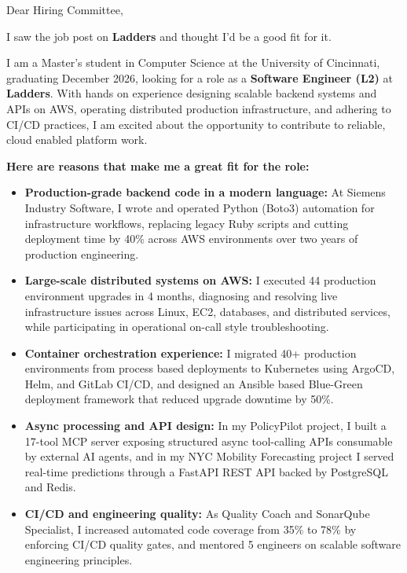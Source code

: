 \documentclass[11pt]{letter}
\date{}
\begin{document}
\begin{letter}{}

\opening{Dear Hiring Committee,}

I saw the job post on \textbf{Ladders} and thought I'd be a good fit for it.

I am a Master's student in Computer Science at the University of Cincinnati, graduating December 2026, looking for a role as a \textbf{Software Engineer (L2)} at \textbf{Ladders}. With hands on experience designing scalable backend systems and APIs on AWS, operating distributed production infrastructure, and adhering to CI/CD practices, I am excited about the opportunity to contribute to reliable, cloud enabled platform work.

\textbf{Here are reasons that make me a great fit for the role:}

\begin{itemize}[leftmargin=*, itemsep=0.45em]
    \item \textbf{Production-grade backend code in a modern language:} At Siemens Industry Software, I wrote and operated Python (Boto3) automation for infrastructure workflows, replacing legacy Ruby scripts and cutting deployment time by 40\% across AWS environments over two years of production engineering.

    \item \textbf{Large-scale distributed systems on AWS:} I executed 44 production environment upgrades in 4 months, diagnosing and resolving live infrastructure issues across Linux, EC2, databases, and distributed services, while participating in operational on-call style troubleshooting.

    \item \textbf{Container orchestration experience:} I migrated 40+ production environments from process based deployments to Kubernetes using ArgoCD, Helm, and GitLab CI/CD, and designed an Ansible based Blue-Green deployment framework that reduced upgrade downtime by 50\%.

    \item \textbf{Async processing and API design:} In my PolicyPilot project, I built a 17-tool MCP server exposing structured async tool-calling APIs consumable by external AI agents, and in my NYC Mobility Forecasting project I served real-time predictions through a FastAPI REST API backed by PostgreSQL and Redis.

    \item \textbf{CI/CD and engineering quality:} As Quality Coach and SonarQube Specialist, I increased automated code coverage from 35\% to 78\% by enforcing CI/CD quality gates, and mentored 5 engineers on scalable software engineering principles.
\end{itemize}


\end{letter}
\end{document}
